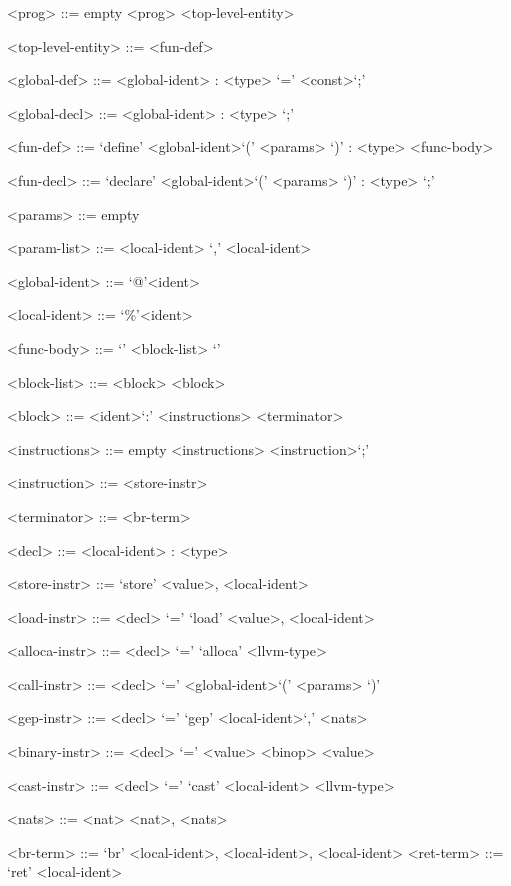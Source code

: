\documentclass{article}
\begin{document}
\begin{grammar}

<prog> ::= empty
\alt <prog> <top-level-entity> 

<top-level-entity> ::= <fun-def>

<global-def> ::= <global-ident> : <type> `=' <const>`;'

<global-decl> ::= <global-ident> : <type> `;'

<fun-def> ::= `define' <global-ident>`(' <params> `)' : <type> <func-body>

<fun-decl> ::= `declare' <global-ident>`(' <params> `)' : <type> `;' 

<params> ::= empty

<param-list> ::= <local-ident>
`,' <local-ident> 

<global-ident> ::= `@'<ident>

<local-ident> ::= `\%'<ident>

<func-body> ::= `{' <block-list> `}'

<block-list> ::= <block>
 <block>

<block> ::= <ident>`:' <instructions> <terminator>

<instructions> ::= empty
\alt <instructions> <instruction>`;'

<instruction> ::= <store-instr> 

<terminator> ::= <br-term>

<decl> ::= <local-ident> : <type>

<store-instr> ::= `store' <value>, <local-ident>

<load-instr> ::= <decl> `=' `load' <value>, <local-ident>

<alloca-instr> ::= <decl> `=' `alloca' <llvm-type> 

<call-instr> ::= <decl> `=' <global-ident>`(' <params> `)'  

<gep-instr> ::= <decl> `=' `gep' <local-ident>`,' <nats> 

<binary-instr> ::= <decl> `=' <value> <binop> <value> 

<cast-instr> ::= <decl> `=' `cast' <local-ident> <llvm-type>  

<nats> ::= <nat>
\alt <nat>, <nats> 

<br-term> ::= `br' <local-ident>, <local-ident>, <local-ident> 
<ret-term> ::= `ret' <local-ident> 


\end{grammar}
\end{document}
